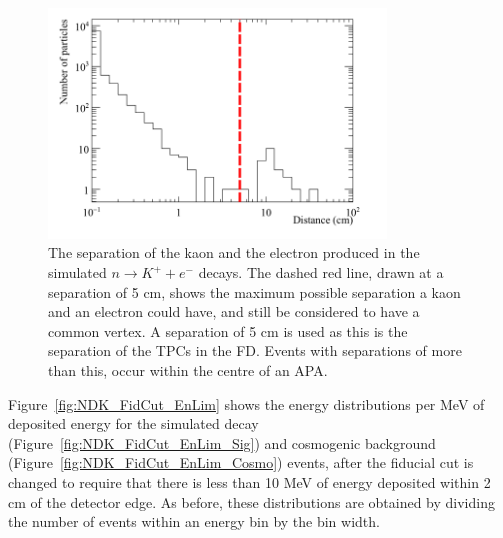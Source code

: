 \begin{figure}
  \centering
  \includegraphics[width=0.8\textwidth]{NucleonDecay_KaonElecSep}
  \caption[The separation of the kaon and the electron produced in the simulated $n \rightarrow K^{+} + e^{-}$ decays]
          {The separation of the kaon and the electron produced in the simulated $n \rightarrow K^{+} + e^{-}$ decays. The dashed red line, drawn at a separation of 5 cm, shows the maximum possible separation a kaon and an electron could have, and still be considered to have a common vertex. A separation of 5 cm is used as this is the separation of the TPCs in the FD. Events with separations of more than this, occur within the centre of an APA.}
  \label{fig:NDK_Sig_KEDist}
\end{figure}

Figure~\ref{fig:NDK_FidCut_EnLim} shows the energy distributions per MeV of deposited energy for the simulated decay (Figure~\ref{fig:NDK_FidCut_EnLim_Sig}) and cosmogenic background (Figure~\ref{fig:NDK_FidCut_EnLim_Cosmo}) events, after the fiducial cut is changed to require that there is less than 10 MeV of energy deposited within 2 cm of the detector edge. As before, these distributions are obtained by dividing the number of events within an energy bin by the bin width. \\

